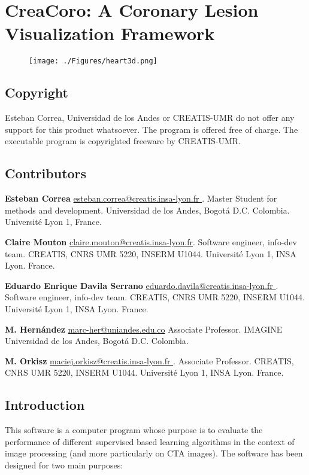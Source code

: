 
\chapter{CreaCoro: A Coronary Lesion Visualization Framework}\label{AppendixB}

\begin{figure}[ht]
	\centering
		\texttt{[image: ./Figures/heart3d.png]}
	\label{fig:longi_feat}
\end{figure}
\clearpage
\section{Copyright}
Esteban Correa, Universidad de los Andes or CREATIS-UMR do not offer any support for this product whatsoever. The program is offered free of charge. The executable program is copyrighted freeware by CREATIS-UMR.

\section{Contributors}

\textbf{Esteban Correa}
\href{mailto:esteban.correa@creatis.insa-lyon.fr }{esteban.correa@creatis.insa-lyon.fr }.
Master Student for methods and development.
Universidad de los Andes, Bogot\'a D.C. Colombia.
Université Lyon 1, France.

\textbf{Claire Mouton}
\href{mailto:claire.mouton@creatis.insa-lyon.fr}{claire.mouton@creatis.insa-lyon.fr}.
Software engineer, info-dev team.
CREATIS, CNRS UMR 5220, INSERM U1044.
Université Lyon 1, INSA Lyon. France.

\textbf{Eduardo Enrique Davila Serrano}
\href{mailto:eduardo.davila@creatis.insa-lyon.fr }{eduardo.davila@creatis.insa-lyon.fr }.
Software engineer, info-dev team.
CREATIS, CNRS UMR 5220, INSERM U1044.
Université Lyon 1, INSA Lyon. France.

\textbf{M. Hern\'andez}
\href{mailto:marc-her@uniandes.edu.co}{marc-her@uniandes.edu.co}
Associate Professor.
IMAGINE
Universidad de los Andes, Bogot\'a D.C. Colombia.

\textbf{M. Orkisz}
\href{mailto:maciej.orkisz@creatis.insa-lyon.fr }{maciej.orkisz@creatis.insa-lyon.fr }.
Associate Professor.
CREATIS, CNRS UMR 5220, INSERM U1044.
Université Lyon 1, INSA Lyon. France.

\section{Introduction}
This software is a computer program whose purpose is to evaluate the performance of different supervised based learning algorithms in the context of image processing (and more particularly on CTA images).
The software has been designed for two main purposes:

